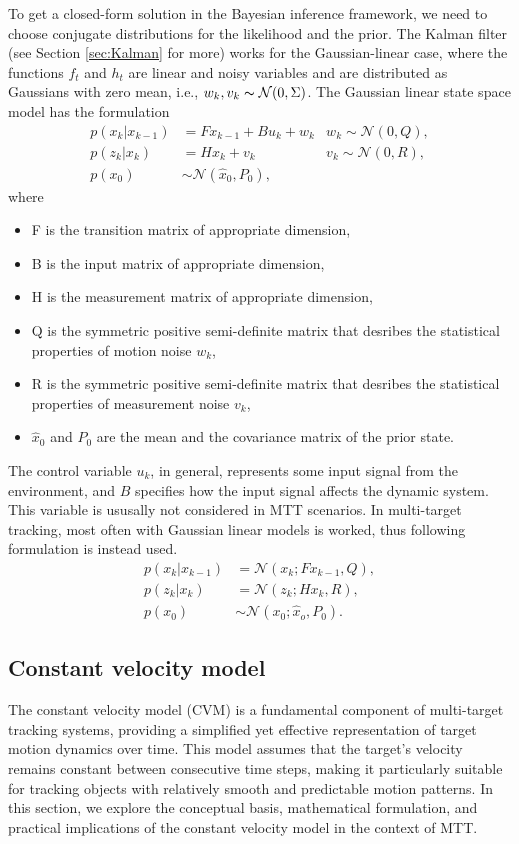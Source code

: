 To get a closed-form solution in the Bayesian inference framework, we need
to choose conjugate distributions for the likelihood and the prior. The Kalman filter (see Section \ref{sec:Kalman} for
more) works for the Gaussian-linear case, where the functions
$f_t$ and $h_t$ are linear and noisy variables and are distributed as Gaussians with zero mean, i.e., $w_k, v_k  \thicksim \mathcal{N}(0,\Sigma)$. The Gaussian linear
state space model has the formulation
\begin{align}
    p(x_k|x_{k-1}) &= Fx_{k-1} + Bu_k + w_k
     &w_k \sim \mathcal{N}(0,Q),\\
    p(z_k|x_k) &= Hx_k + v_k
     &v_k \sim \mathcal{N}(0,R), \\
    p(x_0) &\sim \mathcal{N}(\hat{x}_0, P_0),
\end{align}
where
\begin{itemize}
    \item F is the transition matrix of appropriate dimension,
    \item B is the input matrix of appropriate dimension,
    \item H is the measurement matrix of appropriate dimension,
    \item Q is the symmetric positive semi-definite matrix that desribes the statistical properties of motion noise $
    w_k$,
    \item R is the symmetric positive semi-definite matrix that desribes the statistical properties of measurement
    noise $v_k$,
    \item $\hat{x}_0$ and $P_0$ are the mean and the covariance matrix of the prior state.
\end{itemize}
The control variable $u_k$, in general, represents some input signal from the environment, and
$B$ specifies how the input signal affects the dynamic system. This variable is ususally not considered in MTT scenarios.
In multi-target tracking, most often with Gaussian linear models is worked, thus following formulation is instead used.
\begin{align}
    p(x_k|x_{k-1}) &= \mathcal{N}(x_k; Fx_{k-1}, Q),  \\
    p(z_k|x_k) &= \mathcal{N}(z_k;Hx_k,R), \\
    p(x_0) &\sim \mathcal{N}(x_0;\hat{x}_o, P_0).
\end{align}


    \subsection{Constant velocity model}
The constant velocity model (CVM) is a fundamental component of multi-target tracking systems, providing a simplified yet effective representation of target motion dynamics over time. This model assumes that the target's velocity remains constant between consecutive time steps, making it particularly suitable for tracking objects with relatively smooth and predictable motion patterns. In this section, we explore the conceptual basis, mathematical formulation, and practical implications of the constant velocity model in the context of MTT.

